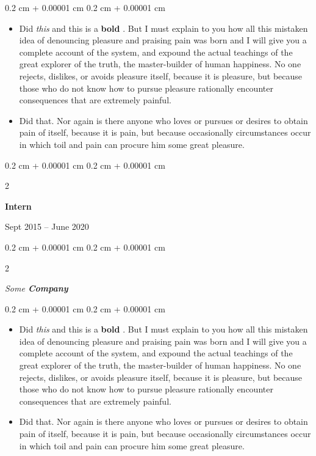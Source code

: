 \documentclass[10pt, letterpaper]{article}
\newenvironment{highlights}{
    \begin{itemize}[
        topsep=0.10 cm,
        parsep=0.10 cm,
        partopsep=0pt,
        itemsep=0pt,
        leftmargin=0.4 cm + 10pt
    ]
}{
    \end{itemize}
} %
\newenvironment{onecolentry}{
    \begin{adjustwidth}{
        0.2 cm + 0.00001 cm
    }{
        0.2 cm + 0.00001 cm
    }
}{
    \end{adjustwidth}
} %
\newenvironment{twocolentry}[2][]{
    \onecolentry
    \def\secondColumn{#2}
    \setcolumnwidth{\fill, 4.5 cm}
    \begin{paracol}{2}
}{
    \switchcolumn \raggedleft \secondColumn
    \end{paracol}
    \endonecolentry
} %
\let\hrefWithoutArrow\href
\renewcommand{\href}[2]{\hrefWithoutArrow{#1}{\ifthenelse{\equal{#2}{}}{ }{#2 }\raisebox{.15ex}{\footnotesize \faExternalLink*}}}
\begin{document}
        \vspace{0.10 cm}
        \begin{onecolentry}
            \begin{highlights}
                \item Did \textit{this} and this is a \textbf{bold} \href{https://example.com}{link}. But I must explain to you how all this mistaken idea of denouncing pleasure and praising pain was born and I will give you a complete account of the system, and expound the actual teachings of the great explorer of the truth, the master-builder of human happiness. No one rejects, dislikes, or avoids pleasure itself, because it is pleasure, but because those who do not know how to pursue pleasure rationally encounter consequences that are extremely painful.
                \item Did that. Nor again is there anyone who loves or pursues or desires to obtain pain of itself, because it is pain, but because occasionally circumstances occur in which toil and pain can procure him some great pleasure.
            \end{highlights}
        \end{onecolentry}


        \vspace{0.2 cm}

                \begin{twocolentry}{
                    Sept 2015 – June 2020
                }
                \textbf{Intern}
                \end{twocolentry}
            \begin{twocolentry}{
            }
            \textit{Some \textbf{Company}}
            \end{twocolentry}

        \vspace{0.10 cm}
        \begin{onecolentry}
            \begin{highlights}
                \item Did \textit{this} and this is a \textbf{bold} \href{https://example.com}{link}. But I must explain to you how all this mistaken idea of denouncing pleasure and praising pain was born and I will give you a complete account of the system, and expound the actual teachings of the great explorer of the truth, the master-builder of human happiness. No one rejects, dislikes, or avoids pleasure itself, because it is pleasure, but because those who do not know how to pursue pleasure rationally encounter consequences that are extremely painful.
                \item Did that. Nor again is there anyone who loves or pursues or desires to obtain pain of itself, because it is pain, but because occasionally circumstances occur in which toil and pain can procure him some great pleasure.
            \end{highlights}
        \end{onecolentry}
\end{document}
